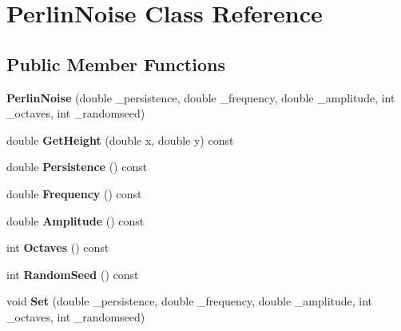 \hypertarget{classPerlinNoise}{}\section{Perlin\+Noise Class Reference}
\label{classPerlinNoise}
\subsection*{Public Member Functions}
\begin{DoxyCompactItemize}
\item 
\mbox{\label{classPerlinNoise_a3926062e9211b00fedd72b1b5d02a537}} 
{\bfseries Perlin\+Noise} (double \+\_\+persistence, double \+\_\+frequency, double \+\_\+amplitude, int \+\_\+octaves, int \+\_\+randomseed)
\item 
\mbox{\label{classPerlinNoise_a1eea20ff062778d6668b32f1d75a8e2a}} 
double {\bfseries Get\+Height} (double x, double y) const
\item 
\mbox{\label{classPerlinNoise_afedd62a39a5a9ab84557468ee1b7e4e4}} 
double {\bfseries Persistence} () const
\item 
\mbox{\label{classPerlinNoise_a6a069cc2ba69c6839a4020f7b6c1e67d}} 
double {\bfseries Frequency} () const
\item 
\mbox{\label{classPerlinNoise_a2a26e52f9a52e9ee7f5df146ae5454ba}} 
double {\bfseries Amplitude} () const
\item 
\mbox{\label{classPerlinNoise_ac0ab4898f04ab91063c2a52688e4c3ee}} 
int {\bfseries Octaves} () const
\item 
\mbox{\label{classPerlinNoise_afd56057a663e6bd69ef7b2df18fbb3a9}} 
int {\bfseries Random\+Seed} () const
\item 
\mbox{\label{classPerlinNoise_a8abb59af3f09c7109b43b208eb4a33c4}} 
void {\bfseries Set} (double \+\_\+persistence, double \+\_\+frequency, double \+\_\+amplitude, int \+\_\+octaves, int \+\_\+randomseed)
\item 
\mbox{\label{classPerlinNoise_a6fc4a8c6d9be6b7139dfc5d9771321f5}} 

\end{DoxyCompactItemize}
